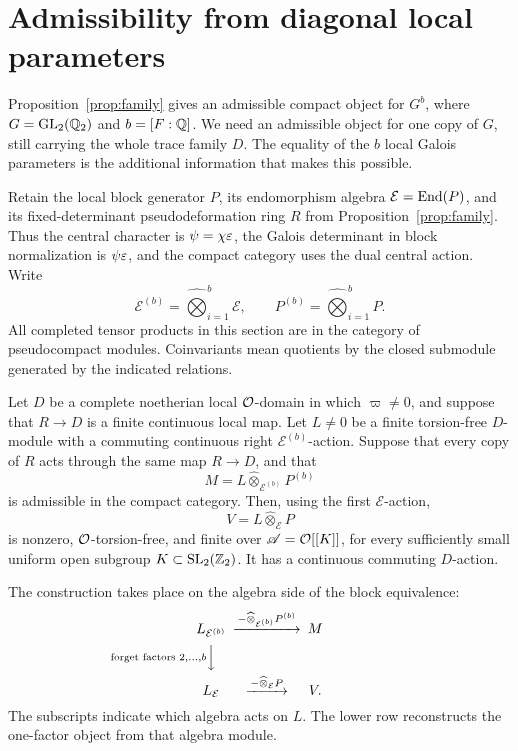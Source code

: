 \section{Admissibility from diagonal local parameters}\label{sec:diagonal}

Proposition~\ref{prop:family} gives an admissible compact object for
\(G^b\), where \(G=\operatorname{GL}_2(\mathbb Q_2)\) and \(b=[F:\mathbb Q]\). We need an
admissible object for one copy of \(G\), still carrying the whole trace
family \(D\). The equality of the \(b\) local Galois parameters is the
additional information that makes this possible.

Retain the local block generator \(P\), its endomorphism algebra
\(\mathcal E=\operatorname{End}(P)\), and its fixed-determinant pseudodeformation ring
\(R\) from Proposition~\ref{prop:family}. Thus the central
character is \(\psi=\chi\varepsilon\), the Galois determinant in block
normalization is \(\psi\varepsilon\), and the compact category uses the dual
central action. Write
\[
 \mathcal E^{(b)}=\widehat\bigotimes_{i=1}^b\mathcal E,
 \qquad P^{(b)}=\widehat\bigotimes_{i=1}^bP.
\]
All completed tensor products in this section are in the category of
pseudocompact modules. Coinvariants mean quotients by the closed
submodule generated by the indicated relations.

\begin{proposition}\label{prop:diagonal}
Let \(D\) be a complete noetherian local \(\mathcal O\)-domain in which
\(\varpi\ne0\), and suppose that \(R\to D\) is a finite continuous
local map. Let \(L\ne0\)
be a finite torsion-free \(D\)-module with a commuting continuous right
\(\mathcal E^{(b)}\)-action. Suppose that every copy of \(R\) acts
through the same map \(R\to D\), and that
\[
 M=L\widehat\otimes_{\mathcal E^{(b)}}P^{(b)}
\]
is admissible in the compact category. Then, using the first
\(\mathcal E\)-action,
\[
 V=L\widehat\otimes_{\mathcal E}P
\]
is nonzero, \(\mathcal O\)-torsion-free, and finite over
\(\mathscr A=\mathcal O[[K]]\), for every sufficiently small uniform open
subgroup \(K\subset\operatorname{SL}_2(\mathbb Z_2)\). It has a continuous commuting
\(D\)-action.
\end{proposition}

The construction takes place on the algebra side of the block equivalence:
\[
\begin{CD}
 L_{\mathcal E^{(b)}} @>{-\widehat\otimes_{\mathcal E^{(b)}}P^{(b)}}>> M\\
 @V{\text{forget factors }2,\ldots,b}VV @.\\
 L_{\mathcal E} @>{-\widehat\otimes_{\mathcal E}P}>> V.
\end{CD}
\]
The subscripts indicate which algebra acts on \(L\). The lower row
reconstructs the one-factor object from that algebra module.

